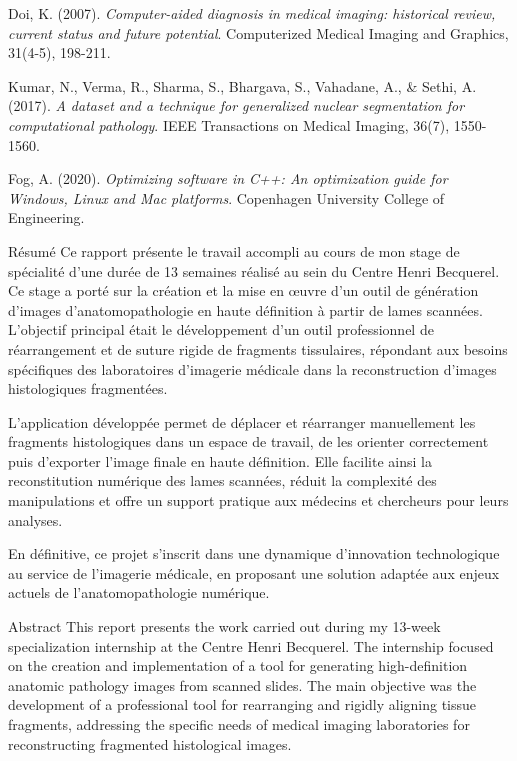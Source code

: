 \documentclass[12pt,a4paper]{report}
\begin{document}
\begin{}
\begin{}
\begin{}
\begin{thebibliography}{20}
Doi, K. (2007). 
\textit{Computer-aided diagnosis in medical imaging: historical review, current status and future potential}. 
Computerized Medical Imaging and Graphics, 31(4-5), 198-211.

Kumar, N., Verma, R., Sharma, S., Bhargava, S., Vahadane, A., \& Sethi, A. (2017). 
\textit{A dataset and a technique for generalized nuclear segmentation for computational pathology}. 
IEEE Transactions on Medical Imaging, 36(7), 1550-1560.

Fog, A. (2020). 
\textit{Optimizing software in C++: An optimization guide for Windows, Linux and Mac platforms}. 
Copenhagen University College of Engineering.

\end{thebibliography}

\newpage
\thispagestyle{empty}

\begin{resume}{Résumé}
Ce rapport présente le travail accompli au cours de mon stage de spécialité d'une durée de 13 semaines réalisé au sein du Centre Henri Becquerel. Ce stage a porté sur la création et la mise en œuvre d'un outil de génération d'images d'anatomopathologie en haute définition à partir de lames scannées. L'objectif principal était le développement d'un outil professionnel de réarrangement et de suture rigide de fragments tissulaires, répondant aux besoins spécifiques des laboratoires d'imagerie médicale dans la reconstruction d'images histologiques fragmentées.

L'application développée permet de déplacer et réarranger manuellement les fragments histologiques dans un espace de travail, de les orienter correctement puis d'exporter l'image finale en haute définition. Elle facilite ainsi la reconstitution numérique des lames scannées, réduit la complexité des manipulations et offre un support pratique aux médecins et chercheurs pour leurs analyses.

En définitive, ce projet s'inscrit dans une dynamique d'innovation technologique au service de l'imagerie médicale, en proposant une solution adaptée aux enjeux actuels de l'anatomopathologie numérique.
\end{resume}

\begin{resume}{Abstract}
This report presents the work carried out during my 13-week specialization internship at the Centre Henri Becquerel. The internship focused on the creation and implementation of a tool for generating high-definition anatomic pathology images from scanned slides. The main objective was the development of a professional tool for rearranging and rigidly aligning tissue fragments, addressing the specific needs of medical imaging laboratories for reconstructing fragmented histological images.


\end{resume}
\end{}
\end{}
\end{}
\end{document}

